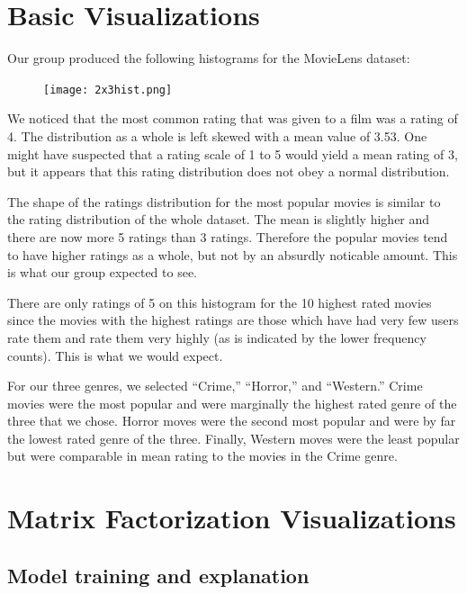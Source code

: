 \section{Basic Visualizations}
Our group produced the following histograms for the MovieLens dataset:
\begin{figure}[H]
    \centering 
    \texttt{[image: 2x3hist.png]}
\end{figure}
We noticed that the most common rating that was given to a film was a rating of 4. The distribution as a whole is left skewed with a 
mean value of 3.53. One might have suspected that a rating scale of 1 to 5 would yield a mean rating of 3, but it appears that this rating 
distribution does not obey a normal distribution.
\par 
The shape of the ratings distribution for the most popular movies is similar to the rating distribution of the whole dataset. The mean is slightly 
higher and there are now more 5 ratings than 3 ratings. Therefore the popular movies tend to have higher ratings as a whole, but not by an absurdly 
noticable amount. This is what our group expected to see.
\par 
There are only ratings of 5 on this histogram for the 10 highest rated movies since the movies with the highest ratings are those which have had 
very few users rate them and rate them very highly (as is indicated by the lower frequency counts). This is what we would expect.
\par 
For our three genres, we selected ``Crime,'' ``Horror,'' and ``Western.'' Crime movies were the most popular and were marginally the highest rated 
genre of the three that we chose. Horror moves were the second most popular and were by far the lowest rated genre of the three. Finally, Western 
moves were the least popular but were comparable in mean rating to the movies in the Crime genre.
\newpage

\section{Matrix Factorization Visualizations}

\subsection{Model training and explanation}

